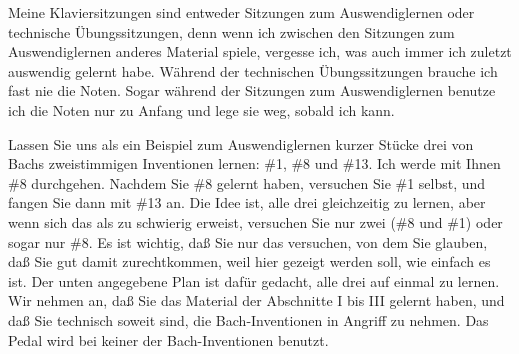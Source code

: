 Meine Klaviersitzungen sind entweder Sitzungen zum Auswendiglernen oder technische Übungssitzungen, denn wenn ich zwischen den Sitzungen zum Auswendiglernen anderes Material spiele, vergesse ich, was auch immer ich zuletzt auswendig gelernt habe.
Während der technischen Übungssitzungen brauche ich fast nie die Noten.
Sogar während der Sitzungen zum Auswendiglernen benutze ich die Noten nur zu Anfang und lege sie weg, sobald ich kann.

Lassen Sie uns als ein Beispiel zum Auswendiglernen kurzer Stücke drei von Bachs zweistimmigen Inventionen lernen: \#1, \#8 und \#13.
Ich werde mit Ihnen \#8 durchgehen.
Nachdem Sie \#8 gelernt haben, versuchen Sie \#1 selbst, und fangen Sie dann mit \#13 an.
Die Idee ist, alle drei gleichzeitig zu lernen, aber wenn sich das als zu schwierig erweist, versuchen Sie nur zwei (\#8 und \#1) oder sogar nur \#8.
Es ist wichtig, daß Sie nur das versuchen, von dem Sie glauben, daß Sie gut damit zurechtkommen, weil hier gezeigt werden soll, wie einfach es ist.
Der unten angegebene Plan ist dafür gedacht, alle drei auf einmal zu lernen.
Wir nehmen an, daß Sie das Material der Abschnitte I bis III gelernt haben, und daß Sie technisch soweit sind, die Bach-Inventionen in Angriff zu nehmen.
Das Pedal wird bei keiner der Bach-Inventionen benutzt.



